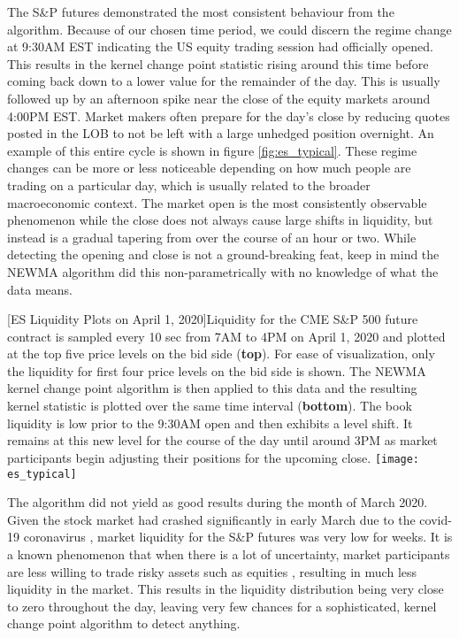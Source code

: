 The S\&P futures demonstrated the most consistent behaviour from the algorithm. Because of our chosen time period, we could discern the regime change at 9:30AM EST indicating the US equity trading session had officially opened. This results in the kernel change point statistic rising around this time before coming back down to a lower value for the remainder of the day. This is usually followed up by an afternoon spike near the close of the equity markets around 4:00PM EST.  Market makers often prepare for the day's close by reducing quotes posted in the LOB to not be left with a large unhedged position overnight. An example of this entire cycle is shown in figure \ref{fig:es_typical}. These regime changes can be more or less noticeable depending on how much people are trading on a particular day, which is usually related to the broader macroeconomic context. The market open is the most consistently observable phenomenon while the close does not always cause large shifts in liquidity,  but instead is a gradual tapering from over the course of an hour or two. While detecting the opening and close is not a ground-breaking feat, keep in mind the NEWMA algorithm did this non-parametrically with no knowledge of what the data means. 

\begin{minipage}{0.96\textwidth}
\begin{center} 
[ES Liquidity Plots on April 1, 2020]{Liquidity for the CME S\&P 500 future contract is sampled every 10 sec from 7AM to 4PM on April 1, 2020 and plotted at the top five price levels on the bid side (\textbf{top}). For ease of visualization, only the liquidity for first four price levels on the bid side is shown. The NEWMA kernel change point algorithm is then applied to this data and the resulting kernel statistic is plotted over the same time interval (\textbf{bottom}). The book liquidity is low prior to the 9:30AM open and then exhibits a level shift. It remains at this new level for the course of the day until around 3PM as market participants begin adjusting their positions for the upcoming close.} 
\texttt{[image: es\_typical]} 
\label{fig:es_typical} 
\end{center}
\end{minipage}

The algorithm did not yield as good results during the month of March 2020. Given the stock market had crashed significantly in early March due to the covid-19 coronavirus \cite{gormsen2020coronavirus}, market liquidity for the S\&P futures was very low for weeks. It is a known phenomenon that when there is a lot of uncertainty, market participants are less willing to trade risky assets such as equities \cite{mccauley2012risk}, resulting in much less liquidity in the market. This results in the liquidity distribution being very close to zero throughout the day, leaving very few chances for a sophisticated, kernel change point algorithm to detect anything. 


